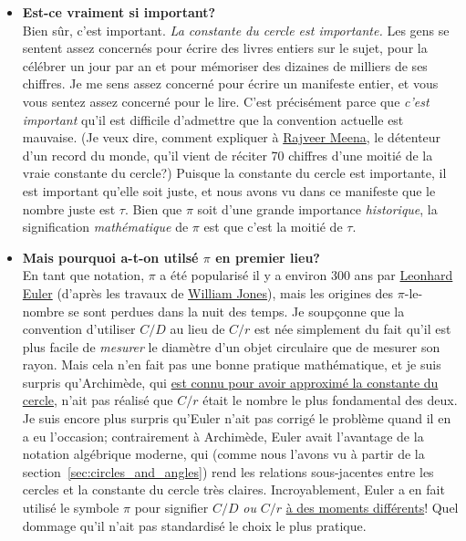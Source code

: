 \begin{itemize}
  \item \textbf{Est-ce vraiment si important\ns?} \\ Bien sûr, c'est important.
  \emph{La constante du cercle est importante.} Les gens se sentent assez concernés
  pour écrire des livres entiers sur le sujet, pour la célébrer un
  jour par an et pour mémoriser des dizaines de milliers de
  ses chiffres. Je me sens assez concerné pour écrire un manifeste entier, et vous
  vous sentez assez concerné pour le lire. C'est précisément parce que \emph{c'est
  important} qu'il est difficile d'admettre que la convention actuelle est
  mauvaise. (Je veux dire, comment expliquer à
  \href{https://translate.google.com/translate?hl=en&sl=en&tl=fr&u=https://www.guinnessworldrecords.com/world-records/most-pi-places-memorised}{Rajveer
  Meena}, le détenteur d'un record du monde, qu'il vient de réciter 70
  chiffres d'une moitié de la vraie constante du cercle\ns?) Puisque la constante
  du cercle est importante, il est important qu'elle soit juste, et nous avons
  vu dans ce manifeste que le nombre juste est $\tau$. Bien que $\pi$ soit d'une
  grande importance \emph{historique}, la signification \emph{mathématique} de
  $\pi$ est que c'est la moitié de $\tau$.

  \item \textbf{Mais pourquoi a-t-on utilsé $\pi$ en premier lieu\ns?}
  \\ En tant que notation, $\pi$ a été popularisé il y a environ 300 ans par
  \href{https://fr.wikipedia.org/wiki/Leonhard_Euler}{Leonhard Euler} (d'après
  les travaux de
  \href{https://fr.wikipedia.org/wiki/William_Jones_(mathématicien)}{William
  Jones}), mais les origines des $\pi$-le-nombre se sont perdues dans la nuit des
  temps. Je soupçonne que la convention d'utiliser $C/D$ au lieu de $C/r$ est
  née simplement du fait qu'il est plus facile de \emph{mesurer} le diamètre d'un
  objet circulaire que de mesurer son rayon. Mais cela n'en fait pas une bonne pratique
  mathématique, et je suis surpris qu'Archimède, qui \href{https://translate.google.com/translate?hl=en&sl=en&tl=fr&u=http://itech.fgcu.edu/faculty/clindsey/mhf4404/archimedes/archimedes.html}{est
  connu pour avoir approximé la constante du cercle}, n'ait pas réalisé que $C/r$ était
  le nombre le plus fondamental des deux. Je suis encore plus surpris qu'Euler n'ait pas
  corrigé le problème quand il en a eu l'occasion\ns; contrairement à Archimède,
  Euler avait l'avantage de la notation algébrique moderne, qui (comme nous
  l'avons vu à partir de la section~\ref{sec:circles_and_angles}) rend les
  relations sous-jacentes entre les cercles et la constante du cercle très
  claires. Incroyablement, Euler a en fait utilisé le symbole $\pi$ pour
  signifier $C/D$ \emph{ou} $C/r$
  \href{https://translate.google.com/translate?hl=en&sl=en&tl=fr&u=https%3A%2F%2Fen.wikipedia.org%2Fwiki%2FPi%23Adoption_of_the_symbol_π&sandbox=1}{à
  des moments
  différents}\ns! Quel dommage qu'il n'ait pas standardisé le choix le plus
  pratique.


\end{itemize}
